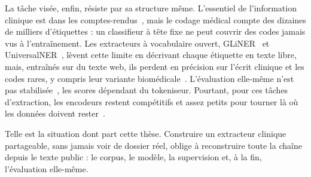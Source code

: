 La tâche visée, enfin, résiste par sa structure même. L'essentiel de l'information
clinique est dans les comptes-rendus~\citep{raghavan_how_2014}, mais le codage médical
compte des dizaines de milliers d'étiquettes : un classifieur à tête fixe ne peut
couvrir des codes jamais vus à l'entraînement. Les extracteurs à vocabulaire ouvert,
GLiNER~\citep{zaratiana2024gliner} et UniversalNER~\citep{zhou2024universalner}, lèvent
cette limite en décrivant chaque étiquette en texte libre, mais, entraînés sur du texte
web, ils perdent en précision sur l'écrit clinique et les codes rares, y compris leur
variante biomédicale~\citep{zaratiana2025glinerbiomed}. L'évaluation elle-même n'est pas
stabilisée~\citep{drbenchmark2024}, les scores dépendant du tokeniseur. Pourtant, pour
ces tâches d'extraction, les encodeurs restent compétitifs et assez petits pour tourner
là où les données doivent rester~\citep{lehman_we_2023}.

Telle est la situation dont part cette thèse. Construire un extracteur clinique
partageable, sans jamais voir de dossier réel, oblige à reconstruire toute la chaîne
depuis le texte public : le corpus, le modèle, la supervision et, à la fin,
l'évaluation elle-même.
